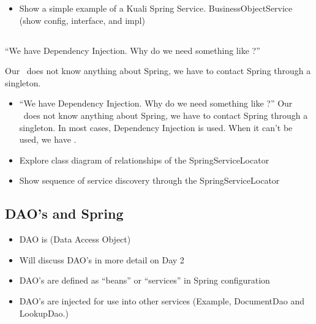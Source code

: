 \begin{ifhtml}
\begin{s5slide}
    \begin{s5notes}
      \begin{itemize}
        \item Show a simple example of a Kuali Spring Service. BusinessObjectService (show config, interface, and impl)
      \end{itemize}
    \end{s5notes} 
  \end{s5slide}

  \begin{s5slide}
    \section{}
    ``We have Dependency Injection. Why do we need something like ?'' 

    Our \MVC \ does not know anything about Spring, we have to contact Spring through a singleton. 

    \begin{slideshow}
      \item {}
      \item {}
    \end{slideshow}

    \begin{s5notes}
      \begin{itemize}
        \item ``We have Dependency Injection. Why do we need something like ?'' Our \MVC \ does not know 
          anything about Spring, we have to contact Spring through a singleton. In most cases, Dependency Injection is used. When 
          it can't be used, we have .
        \item Explore class diagram of relationships of the SpringServiceLocator
        \item Show sequence of service discovery through the SpringServiceLocator
      \end{itemize}
    \end{s5notes} 
  \end{s5slide}

  \begin{s5slide}
    \section{DAO's and Spring}
    \begin{itemize}
      \item DAO is (Data Access Object)
      \item Will discuss DAO's in more detail on Day 2
      \item DAO's are defined as ``beans'' or ``services'' in Spring configuration
      \item DAO's are injected for use into other services (Example, DocumentDao and LookupDao.)
    \end{itemize}


\end{s5slide}
\end{ifhtml}
